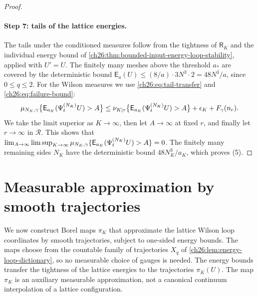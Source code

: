 \begin{proof}
\paragraph{Step 7: tails of the lattice energies.}
The tails under the conditioned measures follow from the tightness of $\mathsf R_K$ and the individual energy bound of \cref{ch26:thm:bounded-input-energy-loop-stability}, applied with $U'=U$. The finitely many meshes above the threshold $a_*$ are covered by the deterministic bound $\mathsf E_a(U)\le(8/a)\cdot3N^3\cdot2=48N^3/a$, since $0\le q\le2$. For the Wilson measures we use \eqref{ch26:eq:tail-transfer} and \eqref{ch26:eq:failure-bound}:
\[
 \mu_{N_K,\gamma}\bigl\{\mathsf E_{a_K}(\Psi^{(N_K)}_tU)>A\bigr\}\le\nu_{K\mid r}\bigl\{\mathsf E_{a_K}(\Psi^{(N_K)}_tU)>A\bigr\}+\epsilon_K+F_\gamma(n_r).
\]
We take the limit superior as $K\to\infty$, then let $A\to\infty$ at fixed $r$, and finally let $r\to\infty$ in $\mathcal R$. This shows that $\lim_{A\to\infty}\limsup_{K\to\infty}\mu_{N_K,\gamma}\{\mathsf E_{a_K}(\Psi^{(N_K)}_tU)>A\}=0$. The finitely many remaining sides $N_K$ have the deterministic bound $48N_K^3/a_K$, which proves (5).
\end{proof}

\section{Measurable approximation by smooth trajectories}\label{ch26:sec:measurable-maps}

We now construct Borel maps $\pi_K$ that approximate the lattice Wilson loop coordinates by smooth trajectories, subject to one-sided energy bounds. The maps choose from the countable family of trajectories $X_q$ of \cref{ch26:lem:energy-loop-dictionary}, so no measurable choice of gauges is needed. The energy bounds transfer the tightness of the lattice energies to the trajectories $\pi_K(U)$. The map $\pi_K$ is an auxiliary measurable approximation, not a canonical continuum interpolation of a lattice configuration.

